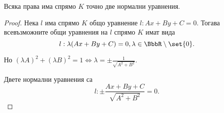 \documentclass{../../common/topic}
\begin{document}
\begin{proposition}
  Всяка права има спрямо \( K \) точно две нормални уравнения.
\end{proposition}
\begin{proof}
  Нека \( l \) има спрямо \( K \) общо уравнение \( l: Ax + By + C = 0 \). Тогава всевъзможните общи уравнения на \( l \) спрямо \( K \) имат вида
  \begin{equation*}
    l: \lambda(Ax + By + C) = 0, \lambda \in \BbbR \setminus \set{ 0 }.
  \end{equation*}

  Но \( {(\lambda A)}^2 + {(\lambda B)}^2 = 1 \iff \lambda = \pm \frac 1 {\sqrt{A^2 + B^2}} \).

  Двете нормални уравнения са
  \begin{equation*}
    l: \pm \frac {Ax + By + C} {\sqrt{A^2 + B^2}} = 0.
  \end{equation*}
\end{proof}
\end{document}
